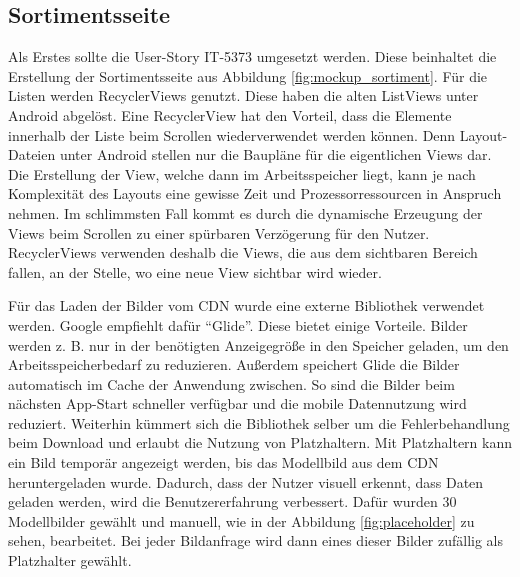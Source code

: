 \subsection{Sortimentsseite}
\label{sec:sortimentsseite}


Als Erstes sollte die User-Story IT-5373 umgesetzt werden. Diese beinhaltet die Erstellung der Sortimentsseite aus Abbildung \ref{fig:mockup_sortiment}. Für die Listen werden RecyclerViews genutzt. Diese haben die alten ListViews unter Android abgelöst. Eine RecyclerView hat den Vorteil, dass die Elemente innerhalb der Liste beim Scrollen wiederverwendet werden können. Denn Layout-Dateien unter Android stellen nur die Baupläne für die eigentlichen Views dar. Die Erstellung der View, welche dann im Arbeitsspeicher liegt, kann je nach Komplexität des Layouts eine gewisse Zeit und Prozessorressourcen in Anspruch nehmen. Im schlimmsten Fall kommt es durch die dynamische Erzeugung der Views beim Scrollen zu einer spürbaren Verzögerung für den Nutzer. RecyclerViews verwenden deshalb die Views, die aus dem sichtbaren Bereich fallen, an der Stelle, wo eine neue View sichtbar wird wieder.

Für das Laden der Bilder vom \gls{CDN} wurde eine externe Bibliothek verwendet werden. Google empfiehlt dafür \enquote{Glide}. Diese bietet einige Vorteile. Bilder werden z. B. nur in der benötigten Anzeigegröße in den Speicher geladen, um den Arbeitsspeicherbedarf zu reduzieren. Außerdem speichert Glide die Bilder automatisch im Cache der Anwendung zwischen. So sind die Bilder beim nächsten App-Start schneller verfügbar und die mobile Datennutzung wird reduziert. Weiterhin kümmert sich die Bibliothek selber um die Fehlerbehandlung beim Download und erlaubt die Nutzung von Platzhaltern. Mit Platzhaltern kann ein Bild temporär angezeigt werden, bis das Modellbild aus dem \gls{CDN} heruntergeladen wurde. Dadurch, dass der Nutzer visuell erkennt, dass Daten geladen werden, wird die Benutzererfahrung verbessert. Dafür wurden 30 Modellbilder gewählt und manuell, wie in der Abbildung \ref{fig:placeholder} zu sehen, bearbeitet. Bei jeder Bildanfrage wird dann eines dieser Bilder zufällig als Platzhalter gewählt.

